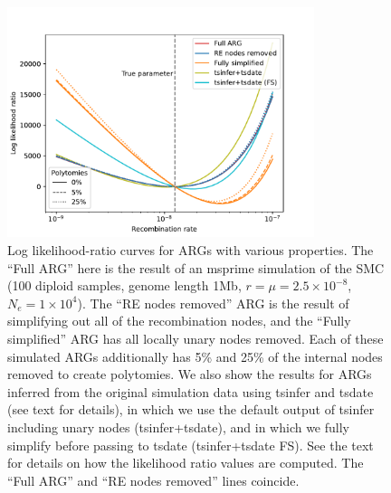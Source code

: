 \documentclass{article}
\begin{document}
\begin{figure}
    \centering
    \includegraphics[width=0.8\textwidth]{figures/likelihood_surface}
    \caption{Log likelihood-ratio curves for ARGs with various properties.
    The ``Full ARG'' here is the result of an 
    msprime simulation of the SMC (100 diploid samples, genome length 1Mb, 
    $r=\mu=2.5\times10^{-8}$, $N_e=1\times10^4$).
    The ``RE nodes removed'' ARG is the 
    result of simplifying out all of the recombination nodes,
    and the ``Fully simplified'' ARG has all locally unary nodes removed. 
    Each of these simulated ARGs additionally has 5\% and 25\% of the 
    internal nodes removed to create polytomies.
    We also show the results for ARGs inferred from the original simulation
    data using tsinfer and tsdate 
    (see text for details), in which we use the default output of tsinfer
    including unary nodes (tsinfer+tsdate), and in which we fully simplify 
    before passing to tsdate (tsinfer+tsdate FS). 
    See the text for details on how the likelihood ratio 
    values are computed.
    The ``Full ARG'' and ``RE nodes removed'' lines coincide.
    \label{fig:lik-surface}}
\end{figure}
\end{document}
